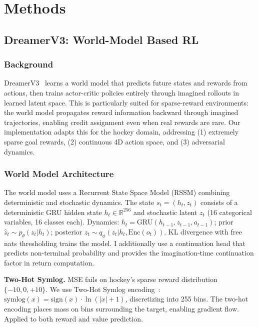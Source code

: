 \documentclass[11pt]{article}
\begin{document}
\section{Methods}\label{sec:method}

\subsection{DreamerV3: World-Model Based RL}\label{subsec:dreamer-method}

\subsubsection{Background}

DreamerV3~\cite{hafner2024} learns a world model that predicts future states and rewards from actions, then trains actor-critic policies entirely through imagined rollouts in learned latent space. This is particularly suited for sparse-reward environments: the world model propagates reward information backward through imagined trajectories, enabling credit assignment even when real rewards are rare. Our implementation adapts this for the hockey domain, addressing (1) extremely sparse goal rewards, (2) continuous 4D action space, and (3) adversarial dynamics.

\subsubsection{World Model Architecture}

The world model uses a Recurrent State Space Model (RSSM) combining deterministic and stochastic dynamics. The state $s_t = (h_t, z_t)$ consists of a deterministic GRU hidden state $h_t \in \mathbb{R}^{256}$ and stochastic latent $z_t$ (16 categorical variables, 16 classes each). Dynamics: $h_t = \text{GRU}(h_{t-1}, z_{t-1}, a_{t-1})$; prior $\hat{z}_t \sim p_\theta(z_t | h_t)$; posterior $z_t \sim q_\phi(z_t | h_t, \text{Enc}(o_t))$. KL divergence with free nats thresholding trains the model. I additionally use a continuation head that predicts non-terminal probability and provides the imagination-time continuation factor in return computation.

\textbf{Two-Hot Symlog.} MSE fails on hockey's sparse reward distribution $\{-10, 0, +10\}$. We use Two-Hot Symlog encoding~\cite{hafner2024}: $\text{symlog}(x) = \text{sign}(x) \cdot \ln(|x| + 1)$, discretizing into 255 bins. The two-hot encoding places mass on bins surrounding the target, enabling gradient flow. Applied to both reward and value prediction.
\end{document}
